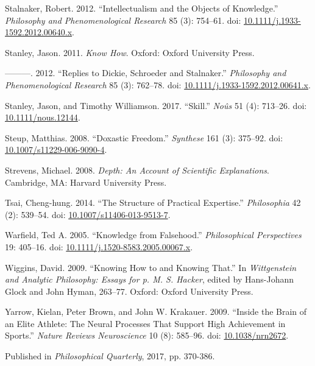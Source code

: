 \documentclass[
  11pt,
  letterpaper,
  DIV=11,
  numbers=noendperiod,
  twoside]{scrartcl}
\newlength{\cslhangindent}
\newenvironment{CSLReferences}[2] %
 {\begin{list}{}{%
  \setlength{\itemindent}{0pt}
  \setlength{\leftmargin}{0pt}
  \setlength{\parsep}{0pt}
  \ifodd #1
   \setlength{\leftmargin}{\cslhangindent}
   \setlength{\itemindent}{-1\cslhangindent}
  \fi
  \setlength{\itemsep}{#2\baselineskip}}}
 {\end{list}}
\begin{document}
\begin{CSLReferences}{1}{0}
Stalnaker, Robert. 2012. {``Intellectualism and the Objects of
Knowledge.''} \emph{Philosophy and Phenomenological Research} 85 (3):
754--61. doi:
\href{https://doi.org/10.1111/j.1933-1592.2012.00640.x}{10.1111/j.1933-1592.2012.00640.x}.

Stanley, Jason. 2011. \emph{Know How}. Oxford: Oxford University Press.

---------. 2012. {``Replies to Dickie, Schroeder and Stalnaker.''}
\emph{Philosophy and Phenomenological Research} 85 (3): 762--78. doi:
\href{https://doi.org/10.1111/j.1933-1592.2012.00641.x}{10.1111/j.1933-1592.2012.00641.x}.

Stanley, Jason, and Timothy Williamson. 2017. {``Skill.''} \emph{No{û}s}
51 (4): 713--26. doi:
\href{https://doi.org/10.1111/nous.12144}{10.1111/nous.12144}.

Steup, Matthias. 2008. {``Doxastic Freedom.''} \emph{Synthese} 161 (3):
375--92. doi:
\href{https://doi.org/10.1007/s11229-006-9090-4}{10.1007/s11229-006-9090-4}.

Strevens, Michael. 2008. \emph{Depth: An Account of Scientific
Explanations}. Cambridge, MA: Harvard University Press.

Tsai, Cheng-hung. 2014. {``The Structure of Practical Expertise.''}
\emph{Philosophia} 42 (2): 539--54. doi:
\href{https://doi.org/10.1007/s11406-013-9513-7}{10.1007/s11406-013-9513-7}.

Warfield, Ted A. 2005. {``Knowledge from Falsehood.''}
\emph{Philosophical Perspectives} 19: 405--16. doi:
\href{https://doi.org/10.1111/j.1520-8583.2005.00067.x}{10.1111/j.1520-8583.2005.00067.x}.

Wiggins, David. 2009. {``Knowing How to and Knowing That.''} In
\emph{Wittgenstein and Analytic Philosophy: Essays for p. M. S. Hacker},
edited by Hans-Johann Glock and John Hyman, 263--77. Oxford: Oxford
University Press.

Yarrow, Kielan, Peter Brown, and John W. Krakauer. 2009. {``Inside the
Brain of an Elite Athlete: The Neural Processes That Support High
Achievement in Sports.''} \emph{Nature Reviews Neuroscience} 10 (8):
585--96. doi: \href{https://doi.org/10.1038/nrn2672}{10.1038/nrn2672}.

\end{CSLReferences}



\noindent Published in\emph{
Philosophical Quarterly}, 2017, pp. 370-386.
\end{document}
